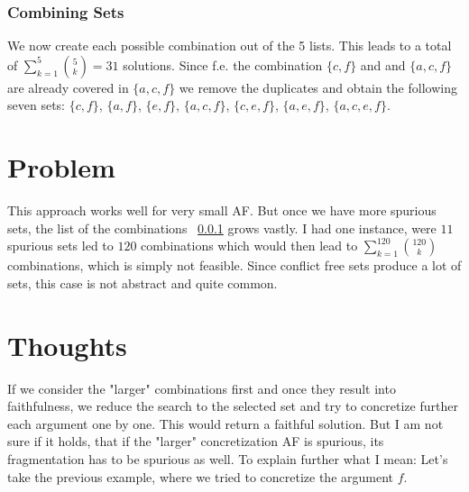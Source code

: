 \subsubsection{Combining Sets}
\label{sssec:l}
We now create each possible combination out of the 5 lists. This leads to a total of $\sum_{k=1}^{5} {5 \choose k}=31$ solutions. Since f.e. the combination $\{c, f\}$ and and $\{a, c, f\}$ are already covered in $\{a, c, f\}$ we remove the duplicates and
obtain the following seven sets: $\{c, f\}$, $\{a, f\}$, $\{e, f\}$, $\{a, c, f\}$, $\{c, e, f\}$, $\{a, e, f\}$, $\{a, c, e, f\}$.

\section{Problem}
This approach works well for very small AF. But once we have more spurious sets, the list of the combinations ~\ref{sssec:l} grows vastly. I had one instance, were $11$ spurious sets led to $120$ combinations
which would then lead to  $\sum_{k=1}^{120} {120 \choose k}$ combinations, which is simply not feasible. Since conflict free sets produce a lot of sets, this case is not abstract and quite common.

\section{Thoughts}
If we consider the "larger" combinations first and once they result into faithfulness, we reduce the search to the selected set and try to concretize further each argument one by one. This would return a faithful solution.
But I am not sure if it holds, that if the "larger" concretization AF is spurious, its fragmentation has to be spurious as well.
To explain further what I mean: Let's take the previous example, where we tried to concretize the argument $f$.
\begin{center}
\end{center}

